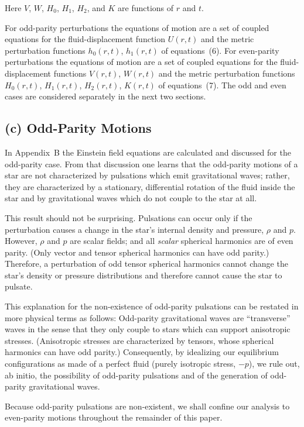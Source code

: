 \documentclass[12pt]{article}
\begin{document}
Here $V$, $W$, $H_{0}$, $H_{1}$, $H_{2}$, and $K$ are functions of $r$ and $t$.

For odd-parity perturbations the equations of motion are a set of coupled equations for
the fluid-displacement function $U(r,t)$ and the metric perturbation functions $h_{0}(r,t)$,
$h_{1}(r,t)$ of equations~(6). For even-parity perturbations the equations of motion are a set
of coupled equations for the fluid-displacement functions $V(r,t)$, $W(r,t)$ and the metric
perturbation functions $H_{0}(r,t)$, $H_{1}(r,t)$, $H_{2}(r,t)$, $K(r,t)$ of equations~(7). The odd and even
cases are considered separately in the next two sections.

\subsection*{(c) Odd-Parity Motions}

In Appendix~B the Einstein field equations are calculated and discussed for the odd-parity
case. From that discussion one learns that the odd-parity motions of a star are not
characterized by pulsations which emit gravitational waves; rather, they are characterized
by a stationary, differential rotation of the fluid inside the star and by gravitational
waves which do not couple to the star at all.

This result should not be surprising. Pulsations can occur only if the perturbation
causes a change in the star's internal density and pressure, $\rho$ and $p$. However, $\rho$ and $p$
are scalar fields; and all \textit{scalar} spherical harmonics are of even parity. (Only vector and
tensor spherical harmonics can have odd parity.) Therefore, a perturbation of odd
tensor spherical harmonics cannot change the star's density or pressure distributions and therefore cannot
cause the star to pulsate.

This explanation for the non-existence of odd-parity pulsations can be restated in
more physical terms as follows: Odd-parity gravitational waves are ``transverse'' waves
in the sense that they only couple to stars which can support anisotropic stresses.
(Anisotropic stresses are characterized by tensors, whose spherical harmonics can have
odd parity.) Consequently, by idealizing our equilibrium configurations as made of a
perfect fluid (purely isotropic stress, $-p$), we rule out, ab initio, the possibility of
odd-parity pulsations and of the generation of odd-parity gravitational waves.

Because odd-parity pulsations are non-existent, we shall confine our analysis to
even-parity motions throughout the remainder of this paper.
\end{document}
